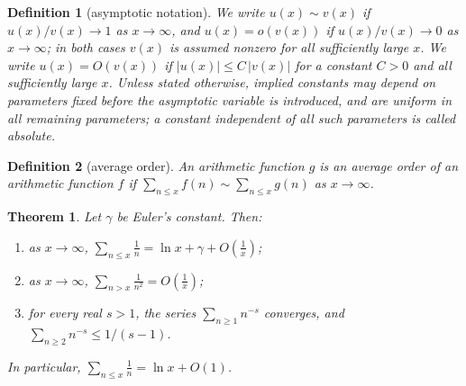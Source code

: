 \documentclass[11pt]{article}
\theoremstyle{ntstyle}
\newtheorem{theorem}{Theorem}[subsection]
\newtheorem{definition}{Definition}[subsection]
\begin{document}
\begin{definition}[asymptotic notation]\label{def:5.7.1}
	We write $u(x)\sim v(x)$ if $u(x)/v(x)\to1$ as $x\to\infty$, and
	$u(x)=o(v(x))$ if $u(x)/v(x)\to0$ as $x\to\infty$; in both cases $v(x)$ is
	assumed nonzero for all sufficiently large $x$. We write $u(x)=O(v(x))$ if
	$|u(x)|\le C\,|v(x)|$ for a constant $C>0$ and all sufficiently large $x$.
	Unless stated otherwise, implied constants may depend on parameters fixed
	before the asymptotic variable is introduced, and are uniform in all
	remaining parameters; a constant independent of all such parameters is
	called absolute.

\end{definition}
\begin{definition}[average order]\label{def:5.7.2} An arithmetic
	function $g$ is an average order of an arithmetic function $f$ if
	$\sum_{n\le x}f(n)\sim\sum_{n\le x}g(n)$ as $x\to\infty$.

\end{definition}
\begin{theorem}\label{thm:5.7.1} Let $\gamma$ be Euler's constant. Then:
	\begin{enumerate}[label={\alph*)}]
		\item as $x\to\infty$, $\displaystyle \sum_{n\le x}\frac{1}{n}=\ln x+\gamma+O\!\left(\frac{1}{x}\right)$;
		\item as $x\to\infty$, $\displaystyle \sum_{n>x}\frac{1}{n^{2}}=O\!\left(\frac{1}{x}\right)$;
		\item for every real $s>1$, the series $\sum_{n\ge1}n^{-s}$ converges, and $\sum_{n\ge2}n^{-s}\le1/(s-1)$.
	\end{enumerate}
	In particular, $\sum_{n\le x}\tfrac{1}{n}=\ln x+O(1)$.

\end{theorem}
\end{document}

